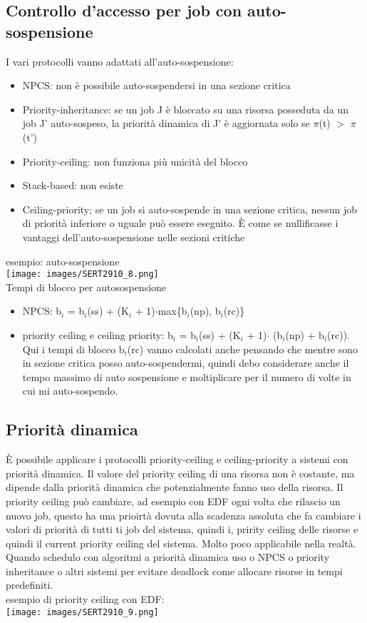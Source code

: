 \documentclass[18px]{article}
\begin{document}
\subsection{Controllo d'accesso per job con auto-sospensione}
I vari protocolli vanno adattati all'auto-sospensione:
\begin{itemize}
\item NPCS: non è possibile auto-sospendersi in una sezione critica
\item Priority-inheritance: se un job J è bloccato su una risorsa posseduta da un job J' auto-sospeso, la priorità dinamica di J' è aggiornata solo se $\pi$(t) $>$ $\pi$(t')
\item Priority-ceiling: non funziona più unicità del blocco
\item Stack-based: non esiste
\item Ceiling-priority; se un job si auto-sospende in una sezione critica, nessun job di priorità inferiore o uguale può essere eseguito. È come se nullificasse i vantaggi dell'auto-sospensione nelle sezioni critiche
\end{itemize}
esempio: auto-sospensione\\
\texttt{[image: images/SERT2910\_8.png]}\\
Tempi di blocco per autosospensione
\begin{itemize}
\item NPCS: b$_{i}$ = b$_{i}$(ss) + (K$_{i}$ + 1)$\cdot$max\{b$_{i}$(np), b$_{i}$(rc)\}
\item priority ceiling e ceiling priority: b$_{i}$ = b$_{i}$(ss) + (K$_{i}$ + 1)$\cdot$ (b$_{i}$(np) + b$_{i}$(rc)). Qui i tempi di blocco b$_{i}$(rc) vanno calcolati anche pensando che mentre sono in sezione critica posso auto-sospendermi, quindi debo considerare anche il tempo massimo di auto sospensione e moltiplicare per il numero di volte in cui mi auto-sospendo.
\end{itemize}
\subsection{Priorità dinamica}
È possibile applicare i protocolli priority-ceiling e ceiling-priority a sistemi con priorità dinamica. Il valore del priority ceiling di una risorsa non è costante, ma dipende dalla priorità dinamica che potenzialmente fanno uso della risorsa. Il priority ceiling può cambiare, ad esempio con EDF ogni volta che rilascio un nuovo job, questo ha una prioirtà dovuta alla scadenza assoluta che fa cambiare i valori di priorità di tutti ti job del sistema, quindi i, pririty ceiling delle risorse e quindi il current priority ceiling del sistema. Molto poco applicabile nella realtà. Quando schedulo con algoritmi a priorità dinamica uso o NPCS o priority inheritance o altri sistemi per evitare deadlock come allocare risorse in tempi predefiniti.\\ esempio di priority ceiling con EDF:\\
\texttt{[image: images/SERT2910\_9.png]}
\end{document}
